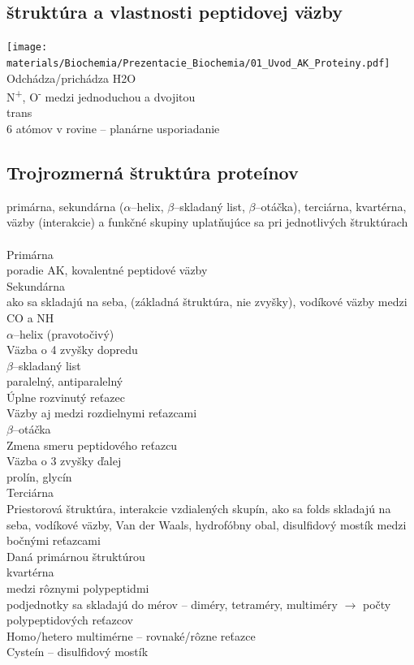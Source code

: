\subsection{štruktúra a vlastnosti peptidovej väzby}

\texttt{[image: materials/Biochemia/Prezentacie\_Biochemia/01\_Uvod\_AK\_Proteiny.pdf]}
\\
Odchádza/prichádza H2O\\
N\textsuperscript{+}, O\textsuperscript{-}
medzi jednoduchou a dvojitou\\
trans\\
6 atómov v rovine -- planárne usporiadanie
\subsection{Trojrozmerná štruktúra proteínov}
primárna, sekundárna ($\alpha$--helix, $\beta$--skladaný list, $\beta$--otáčka), terciárna, kvartérna, 
väzby (interakcie) a funkčné skupiny uplatňujúce sa pri jednotlivých štruktúrach\\
\\
Primárna\\
\tab poradie AK, kovalentné peptidové väzby\\
Sekundárna\\
\tab ako sa skladajú na seba, (základná štruktúra, nie zvyšky), vodíkové väzby medzi CO a NH\\
\tab $\alpha$--helix (pravotočivý)\\
\tab \tab Väzba o 4 zvyšky dopredu\\
\tab $\beta$--skladaný list\\
\tab \tab paralelný, antiparalelný\\
\tab \tab Úplne rozvinutý reťazec\\
\tab \tab Väzby aj medzi rozdielnymi reťazcami\\
\tab $\beta$--otáčka\\
\tab \tab Zmena smeru peptidového reťazcu\\
\tab \tab Väzba o 3 zvyšky ďalej\\
\tab \tab prolín, glycín\\
Terciárna\\
\tab Priestorová štruktúra, interakcie vzdialených skupín, ako sa folds skladajú na seba, vodíkové väzby, Van der Waals, hydrofóbny obal, disulfidový mostík medzi bočnými reťazcami\\
\tab Daná primárnou štruktúrou\\
kvartérna\\
\tab medzi rôznymi polypeptidmi\\
\tab podjednotky sa skladajú do mérov -- diméry, tetraméry, multiméry $\rightarrow$ počty polypeptidových reťazcov\\
\tab Homo/hetero multimérne -- rovnaké/rôzne reťazce\\
Cysteín -- disulfidový mostík\\

